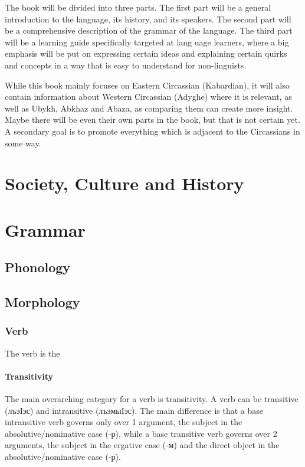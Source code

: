 \documentclass[a4paper, 10pt]{book}
\begin{document}

The book will be divided into three parts. The first part will be a general introduction to the language, its history, and its speakers. The second part will be a comprehensive description of the grammar of the language. The third part will be a learning guide specifically targeted at lang  uage learners, where a big emphasis will be put on expressing certain ideas and explaining certain quirks and concepts in a way that is easy to understand for non-linguists.

While this book mainly focuses on Eastern Circassian (Kabardian), it will also contain information about Western Circassian (Adyghe) where it is relevant, as well as Ubykh, Abkhaz and Abaza, as comparing them can create more insight. Maybe there will be even their own parts in the book, but that is not certain yet. A secondary goal is to promote everything which is adjacent to the Circassians in some way.

\part{Society, Culture and History}
\part{Grammar}
\chapter{Phonology}
\chapter{Morphology}
\section{Verb}
The verb is the 
\subsection{Transitivity}
The main overarching category for a verb is transitivity. A verb can be transitive (лъэIэс) and intransitive (лъэмыIэс). The main difference is that a base intransitive verb governs only over 1 argument, the subject in the absolutive/nominative case (-р), while a base transitive verb governs over 2 arguments, the subject in the ergative case (-м) and the direct object in the absolutive/nominative case (-р).
\end{document}
